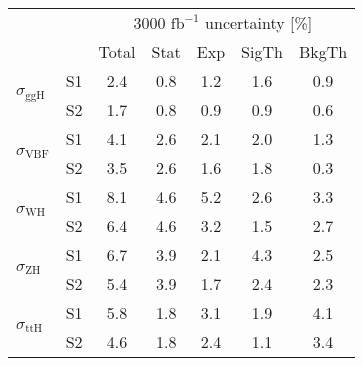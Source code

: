 \begin{tabular}{@{} l c c@{\hskip 0.15in} c c c c @{}}
 \hline
  &  & \multicolumn{5}{c}{3000 $\text{fb}^{-1}$ uncertainty [\%]} \\
  &  & Total & Stat & Exp & SigTh & BkgTh \\
 \hline
\multirow{2}{*}{$\sigma_{\mathrm{ggH}}$} & S1  & 2.4& 0.8 & 1.2 & 1.6 & 0.9  \\[1pt]
                        & S2  & 1.7& 0.8 & 0.9 & 0.9 & 0.6  \\[4pt]
\multirow{2}{*}{$\sigma_{\mathrm{VBF}}$} & S1  & 4.1& 2.6 & 2.1 & 2.0 & 1.3  \\[1pt]
                        & S2  & 3.5& 2.6 & 1.6 & 1.8 & 0.3  \\[4pt]
\multirow{2}{*}{$\sigma_{\mathrm{WH}}$} & S1  & 8.1& 4.6 & 5.2 & 2.6 & 3.3  \\[1pt]
                        & S2  & 6.4& 4.6 & 3.2 & 1.5 & 2.7  \\[4pt]
\multirow{2}{*}{$\sigma_{\mathrm{ZH}}$} & S1  & 6.7& 3.9 & 2.1 & 4.3 & 2.5  \\[1pt]
                        & S2  & 5.4& 3.9 & 1.7 & 2.4 & 2.3  \\[4pt]
\multirow{2}{*}{$\sigma_{\mathrm{ttH}}$} & S1  & 5.8& 1.8 & 3.1 & 1.9 & 4.1  \\[1pt]
                        & S2  & 4.6& 1.8 & 2.4 & 1.1 & 3.4  \\[4pt]
\hline
\end{tabular}